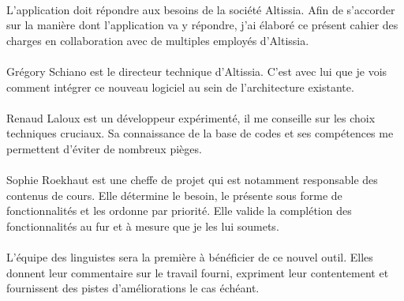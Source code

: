 \paragraph{}
L'application doit répondre aux besoins de la société Altissia.
Afin de s'accorder sur la manière dont l'application va y répondre, j'ai élaboré ce présent cahier des charges en collaboration avec de multiples employés d'Altissia.

\paragraph{}
Grégory Schiano est le directeur technique d'Altissia.
C'est avec lui que je vois comment intégrer ce nouveau logiciel au sein de l'architecture existante.

\paragraph{}
Renaud Laloux est un développeur expérimenté, il me conseille sur les choix techniques cruciaux. Sa connaissance de la base de codes et ses compétences me permettent d'éviter de nombreux pièges.

\paragraph{}
Sophie Roekhaut est une cheffe de projet qui est notamment responsable des contenus de cours. Elle détermine le besoin, le présente sous forme de fonctionnalités et les ordonne par priorité. Elle valide la complétion des fonctionnalités au fur et à mesure que je les lui soumets.

\paragraph{}
L'équipe des linguistes sera la première à bénéficier de ce nouvel outil. Elles donnent leur commentaire sur le travail fourni, expriment leur contentement et fournissent des pistes d'améliorations le cas échéant.
